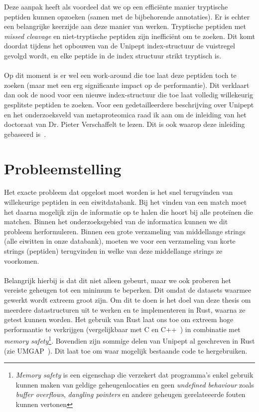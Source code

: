 \documentclass[11pt,dutch,faculty=we,layout=titlefont,underline=false,titleUppercase=true,titleUnderline=true]{ugent2016-report}
\begin{document}
    Deze aanpak heeft als voordeel dat we op een efficiënte manier tryptische peptiden kunnen opzoeken (samen met de bijbehorende annotaties).
    Er is echter een belangrijke keerzijde aan deze manier van werken.
    Tryptische peptiden met \textit{missed cleavage} en niet-tryptische peptiden zijn inefficiënt om te zoeken.
    Dit komt doordat tijdens het opbouwen van de Unipept index-structuur de vuistregel gevolgd wordt, en elke peptide in de index structuur strikt tryptisch is.
    \\ \\
    Op dit moment is er wel een work-around die toe laat deze peptiden toch te zoeken (maar met een erg significante impact op de performantie).
    Dit verklaart dan ook de nood voor een nieuwe index-structuur die toe laat volledig willekeurig gesplitste peptiden te zoeken.
    \newline
    Voor een gedetailleerdere beschrijving over Unipept en het onderzoeksveld van metaproteomica raad ik aan om de inleiding van het doctoraat van Dr. Pieter Verschaffelt te lezen.
    Dit is ook waarop deze inleiding gebaseerd is~\cite{phdPieterUnipept}.


    \section{Probleemstelling}\label{sec:probleemstelling}
    Het exacte probleem dat opgelost moet worden is het snel terugvinden van willekeurige peptiden in een eiwitdatabank.
    Bij het vinden van een match moet het daarna mogelijk zijn de informatie op te halen die hoort bij alle proteïnen die matchen.
    Binnen het onderzoeksgebied van de informatica kunnen we dit probleem herformuleren.
    Binnen een grote verzameling van middellange strings (alle eiwitten in onze databank), moeten we voor een verzameling van korte strings (peptiden) terugvinden in welke van deze middellange strings ze voorkomen.
    \\ \\
    Belangrijk hierbij is dat dit niet alleen gebeurt, maar we ook proberen het vereiste geheugen tot een minimum te beperken.
    Dit omdat de datasets waarmee gewerkt wordt extreem groot zijn.
    Om dit te doen is het doel van deze thesis om meerdere datastructuren uit te werken en te implementeren in Rust, waarna ze getest kunnen worden.
    Het gebruik van Rust laat ons toe om extreem hoge performantie te verkrijgen (vergelijkbaar met C en C++~\cite{rustPerformantie}) in combinatie met \textit{memory safety}\footnote{\textit{Memory safety} is een eigenschap die verzekert dat programma's enkel gebruik kunnen maken van geldige geheugenlocaties en geen \textit{undefined behaviour} zoals \textit{buffer overflows}, \textit{dangling pointers} en andere geheugen gerelateeerde fouten kunnen vertonen}.
    Bovendien zijn sommige delen van Unipept al geschreven in Rust (zie UMGAP~\cite{UMGAP_paper, UMGAP_source}).
    Dit laat toe om waar mogelijk bestaande code te hergebruiken.
\end{document}
